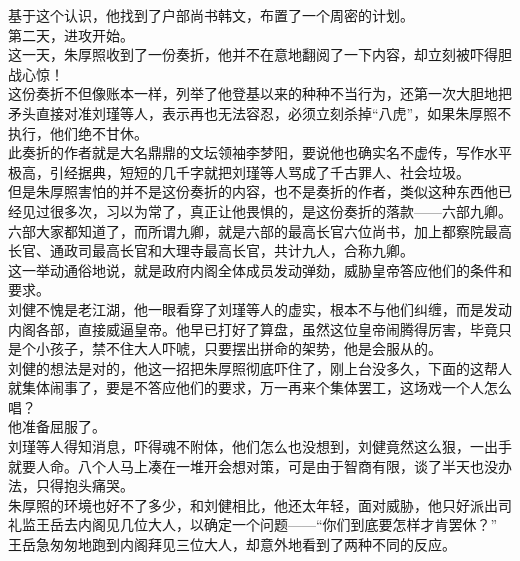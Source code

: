 \begin{multicols}{\theparacolNo}
基于这个认识，他找到了户部尚书韩文，布置了一个周密的计划。\\

第二天，进攻开始。\\

这一天，朱厚照收到了一份奏折，他并不在意地翻阅了一下内容，却立刻被吓得胆战心惊！\\

这份奏折不但像账本一样，列举了他登基以来的种种不当行为，还第一次大胆地把矛头直接对准刘瑾等人，表示再也无法容忍，必须立刻杀掉“八虎”，如果朱厚照不执行，他们绝不甘休。\\

此奏折的作者就是大名鼎鼎的文坛领袖李梦阳，要说他也确实名不虚传，写作水平极高，引经据典，短短的几千字就把刘瑾等人骂成了千古罪人、社会垃圾。\\

但是朱厚照害怕的并不是这份奏折的内容，也不是奏折的作者，类似这种东西他已经见过很多次，习以为常了，真正让他畏惧的，是这份奏折的落款——六部九卿。\\

六部大家都知道了，而所谓九卿，就是六部的最高长官六位尚书，加上都察院最高长官、通政司最高长官和大理寺最高长官，共计九人，合称九卿。\\

这一举动通俗地说，就是政府内阁全体成员发动弹劾，威胁皇帝答应他们的条件和要求。\\

刘健不愧是老江湖，他一眼看穿了刘瑾等人的虚实，根本不与他们纠缠，而是发动内阁各部，直接威逼皇帝。他早已打好了算盘，虽然这位皇帝闹腾得厉害，毕竟只是个小孩子，禁不住大人吓唬，只要摆出拼命的架势，他是会服从的。\\

刘健的想法是对的，他这一招把朱厚照彻底吓住了，刚上台没多久，下面的这帮人就集体闹事了，要是不答应他们的要求，万一再来个集体罢工，这场戏一个人怎么唱？\\

他准备屈服了。\\

刘瑾等人得知消息，吓得魂不附体，他们怎么也没想到，刘健竟然这么狠，一出手就要人命。八个人马上凑在一堆开会想对策，可是由于智商有限，谈了半天也没办法，只得抱头痛哭。\\

朱厚照的环境也好不了多少，和刘健相比，他还太年轻，面对威胁，他只好派出司礼监王岳去内阁见几位大人，以确定一个问题——“你们到底要怎样才肯罢休？”\\

王岳急匆匆地跑到内阁拜见三位大人，却意外地看到了两种不同的反应。\\


\end{multicols}
